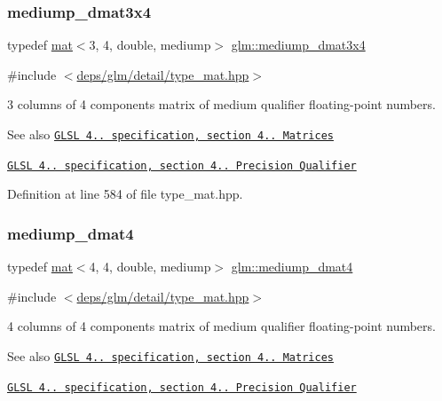 \subsubsection{\texorpdfstring{mediump\+\_\+dmat3x4}{mediump\_dmat3x4}}
{\footnotesize\ttfamily typedef \hyperlink{structglm_1_1mat}{mat}$<$3, 4, double, mediump$>$ \hyperlink{group__core__precision_ga8e38f500f63f5caed06699264acfb456}{glm\+::mediump\+\_\+dmat3x4}}



{\ttfamily \#include $<$\hyperlink{type__mat_8hpp}{deps/glm/detail/type\+\_\+mat.\+hpp}$>$}

3 columns of 4 components matrix of medium qualifier floating-\/point numbers.

\begin{DoxySeeAlso}{See also}
\href{http://www.opengl.org/registry/doc/GLSLangSpec.4.20.8.pdf}{\tt G\+L\+SL 4.. specification, section 4.. Matrices} 

\href{http://www.opengl.org/registry/doc/GLSLangSpec.4.20.8.pdf}{\tt G\+L\+SL 4.. specification, section 4.. Precision Qualifier} 
\end{DoxySeeAlso}


Definition at line 584 of file type\+\_\+mat.\+hpp.

\mbox{\label{group__core__precision_ga4b027f0f888d5ec1e77a00cb5517f56a}} 
\subsubsection{\texorpdfstring{mediump\+\_\+dmat4}{mediump\_dmat4}}
{\footnotesize\ttfamily typedef \hyperlink{structglm_1_1mat}{mat}$<$4, 4, double, mediump$>$ \hyperlink{group__core__precision_ga4b027f0f888d5ec1e77a00cb5517f56a}{glm\+::mediump\+\_\+dmat4}}



{\ttfamily \#include $<$\hyperlink{type__mat_8hpp}{deps/glm/detail/type\+\_\+mat.\+hpp}$>$}

4 columns of 4 components matrix of medium qualifier floating-\/point numbers.

\begin{DoxySeeAlso}{See also}
\href{http://www.opengl.org/registry/doc/GLSLangSpec.4.20.8.pdf}{\tt G\+L\+SL 4.. specification, section 4.. Matrices} 

\href{http://www.opengl.org/registry/doc/GLSLangSpec.4.20.8.pdf}{\tt G\+L\+SL 4.. specification, section 4.. Precision Qualifier} 
\end{DoxySeeAlso}


